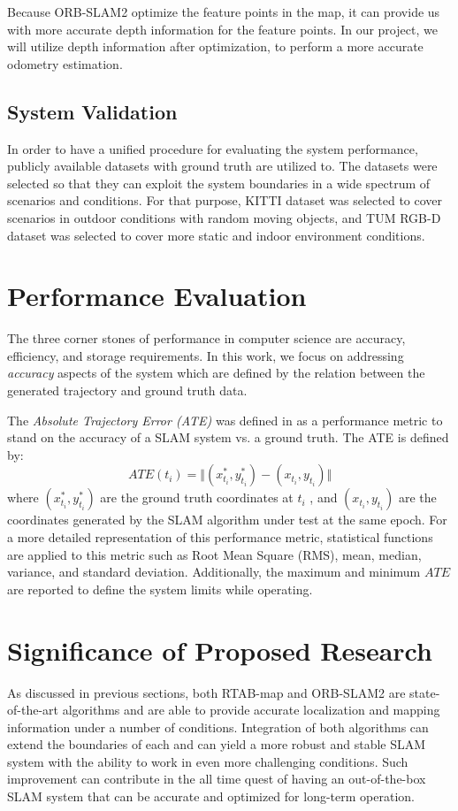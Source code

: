 \documentclass[12pt]{article}
\begin{document}
Because ORB-SLAM2 optimize the feature points in the map, it can provide us with more accurate depth information for the feature points. In our project, we will utilize depth information after optimization, to perform a more accurate odometry estimation.

\subsection{System Validation}
In order to have a unified procedure for evaluating the system performance, publicly available datasets with ground truth are utilized to. The datasets were selected so that they can exploit the system boundaries in a wide spectrum of scenarios and conditions. For that purpose, KITTI dataset \cite{Geiger2012CVPR} was selected to cover scenarios in outdoor conditions with random moving objects, and TUM RGB-D dataset \cite{sturm2012benchmark} was selected to cover more static and indoor environment conditions.

\section{Performance Evaluation}
The three corner stones of performance in computer science are accuracy, efficiency, and storage requirements. In this work, we focus on addressing \textit{accuracy} aspects of the system which are defined by the relation between the generated trajectory and ground truth data. 

The \textit{Absolute Trajectory Error (ATE)} was defined in \cite{8710464} as a performance metric to stand on the accuracy of a SLAM system vs. a ground truth. The ATE is defined by:
\begin{equation}
ATE(t_i) = \Vert (x_{t_i}^*,y_{t_i}^*) - (x_{t_i},y_{t_i}) \Vert
\end{equation}
where $(x_{t_i}^*,y_{t_i}^*)$ are the ground truth coordinates at $t_i$ , and $(x_{t_i},y_{t_i})$ are the coordinates generated by the SLAM algorithm under test at the same epoch. For a more detailed representation of this performance metric, statistical functions are applied to this metric such as Root Mean Square (RMS), mean, median, variance, and standard deviation. Additionally, the maximum and minimum $ATE$ are reported to define the system limits while operating. 
\section{Significance of Proposed Research}
As discussed in previous sections, both RTAB-map and ORB-SLAM2 are state-of-the-art algorithms and are able to provide accurate localization and mapping information under a number of conditions. Integration of both algorithms can extend the boundaries of each and can yield a more robust and stable SLAM system with the ability to work in even more challenging conditions. Such improvement can contribute in the all time quest of having an out-of-the-box SLAM system \cite{cadena2016past} that can be accurate and optimized for long-term operation.

\newpage


 
\end{document}
